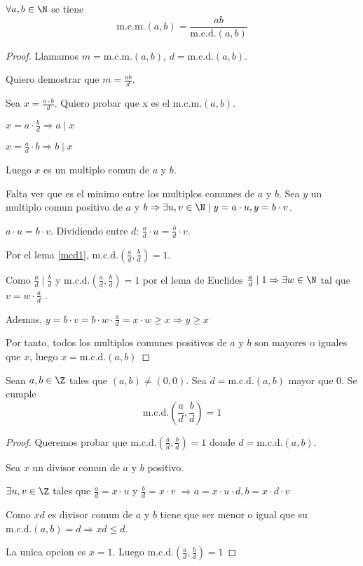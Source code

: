 \begin{proposition}
	\(\forall a,b \in \N \) se tiene
	\[
		\mathrm{m.c.m.}(a,b) = \frac{ab }{\mathrm{m.c.d.}(a,b) }
	\]

\end{proposition}
\begin{proof}
	Llamamos \(m = \mathrm{m.c.m.}(a,b)  \), \(d = \mathrm{m.c.d.}(a,b) \).

	Quiero demostrar que \(m = \frac{ab }{d }\).

	Sea \(x = \frac{a \cdot b }{d }\). Quiero probar que x es el \(\mathrm{m.c.m.}(a,b ) \).

	\(x = a \cdot \frac{b}{d }\Rightarrow a \mid x\)

	\(x = \frac{a}{d}\cdot b \Rightarrow b \mid x \)

	Luego \(x \) es un multiplo comun de \(a \) y \(b \).

	Falta ver que es el minimo entre los multiplos comunes de \(a \) y \(b\).
	Sea \(y \) un multiplo comun positivo de \(a \) y \(b \Rightarrow \exists u,v \in \N \mid y = a \cdot u, y = b \cdot v\).

	\(a \cdot u = b \cdot v \). Dividiendo entre \(d \): \(\frac{a}{d} \cdot u = \frac{b}{d} \cdot v \).

	Por el lema \ref{mcd1}, \(\mathrm{m.c.d.}(\frac{a}{d},\frac{b}{d}) = 1 \).

	Como \(\frac{a}{d} \mid \frac{b}{d }\) y \(\mathrm{m.c.d.}(\frac{a}{d}, \frac{b}{d}) = 1 \) por el lema de Euclides \(\frac{a}{d} \mid 1 \Rightarrow \exists w \in \N\) tal que \(v = w \cdot \frac{a}{d}\) .

	Ademas, \(y = b \cdot v = b \cdot w \cdot \frac{a}{d} = x \cdot w \geq x \Rightarrow y \geq x\)

	Por tanto, todos los multiplos comunes positivos de \(a\) y \(b \) son mayores o iguales que \(x \), luego \(x = \mathrm{m.c.d.}(a,b) \)
\end{proof}

\begin{lemma}
	\label{mcd1}
	Sean \(a,b \in \Z \) tales que \((a,b) \neq (0,0)\). Sea \(d = \mathrm{m.c.d.}(a,b) \) mayor que 0. Se cumple
	\[
		\mathrm{m.c.d.}\left (\frac{a}{d}, \frac{b }{d} \right ) = 1
	\]
\end{lemma}
\begin{proof}
	Queremos probar que \(\mathrm{m.c.d.}(\frac{a}{d},\frac{b}{d}) = 1  \) donde \(d = \mathrm{m.c.d.}(a,b) \).

	Sea \(x \) un divisor comun de \(a \) y \(b \) positivo.

	\(\exists u,v \in \Z \) tales que \(\frac{a}{d} = x \cdot u \) y \(\frac{b}{d} = x \cdot v \) \(\Rightarrow a = x \cdot u \cdot d, b = x \cdot d \cdot v\)

	Como \(xd\) es divisor comun de \(a \) y \(b \) tiene que ser menor o igual que su \(\mathrm{m.c.d.}(a,b) = d \Rightarrow xd \leq d\).

	La unica opcion es \(x = 1 \). Luego \(\mathrm{m.c.d.}(\frac{a}{d}, \frac{b}{d}) = 1 \)
\end{proof}

